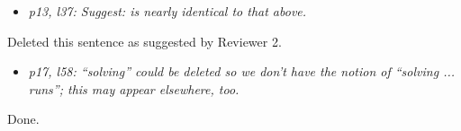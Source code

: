 \documentclass[11pt,notitlepage,onecolumn]{article}
\begin{document}
\begin{itemize}
\item \textit{p13, l37: Suggest: is nearly identical to that above.}
\end{itemize}

\noindent 
Deleted this sentence as suggested by Reviewer 2. 
\medskip 


\begin{itemize}
\item \textit{p17, l58: ``solving'' could be deleted so we don't have the notion of ``solving ... runs''; this may appear elsewhere, too.}
\end{itemize}

\noindent 
Done.
\medskip 
\end{document}
